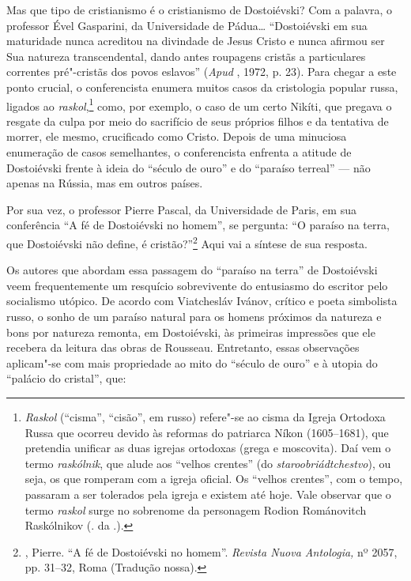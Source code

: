 Mas que tipo de cristianismo é o cristianismo de Dostoiévski? Com a
palavra, o professor Ével Gasparini, da Universidade de Pádua\ldots{}
``Dostoiévski em sua maturidade nunca acreditou na divindade de Jesus
Cristo e nunca afirmou ser Sua natureza transcendental, dando antes
roupagens cristãs a particulares correntes pré"-cristãs dos povos
eslavos'' (\emph{Apud} , 1972, p. 23). Para chegar a este ponto
crucial, o conferencista enumera muitos casos da cristologia popular
russa, ligados ao \emph{raskol},\footnote{\emph{Raskol} (``cisma'',
  ``cisão'', em russo) refere"-se ao cisma da Igreja Ortodoxa Russa que
  ocorreu devido às reformas do patriarca Níkon (1605--1681), que
  pretendia unificar as duas igrejas ortodoxas (grega e moscovita). Daí
  vem o termo \emph{raskólnik}, que alude aos ``velhos crentes'' (do
  \emph{staroobriádtchestvo}), ou seja, os que romperam com a igreja
  oficial. Os ``velhos crentes'', com o tempo, passaram a ser tolerados
  pela igreja e existem até hoje. Vale observar que o termo
  \emph{raskol} surge no sobrenome da personagem Rodion Románovitch
  Raskólnikov (. da .).} como, por exemplo, o caso de um certo
Nikíti, que pregava o resgate da culpa por meio do sacrifício de seus
próprios filhos e da tentativa de morrer, ele mesmo, crucificado como
Cristo. Depois de uma minuciosa enumeração de casos semelhantes, o
conferencista enfrenta a atitude de Dostoiévski frente à ideia do
``século de ouro'' e do ``paraíso terreal'' --- não apenas na Rússia, mas
em outros países.

Por sua vez, o professor Pierre Pascal, da Universidade de Paris, em sua
conferência ``A fé de Dostoiévski no homem'', se pergunta: ``O paraíso
na terra, que Dostoiévski não define, é cristão?''\footnote{,
  Pierre. ``A fé de Dostoiévski no homem''. \emph{Revista Nuova Antologia,}
  nº 2057, pp. 31--32, Roma (Tradução nossa).} Aqui vai a síntese de sua
resposta.

Os autores que abordam essa passagem do ``paraíso na terra'' de
Dostoiévski veem frequentemente um resquício sobrevivente do entusiasmo
do escritor pelo socialismo utópico. De acordo com Viatchesláv Ivánov,
crítico e poeta simbolista russo, o sonho de um paraíso natural para os
homens próximos da natureza e bons por natureza remonta, em Dostoiévski,
às primeiras impressões que ele recebera da leitura das obras de
Rousseau. Entretanto, essas observações aplicam"-se com mais propriedade
ao mito do ``século de ouro'' e à utopia do ``palácio do cristal'', que:

